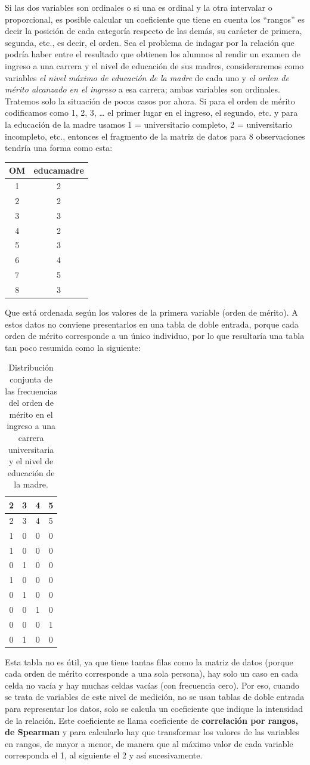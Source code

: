 \documentclass[]{book}
\begin{document}
Si las dos variables son ordinales o si una es ordinal y la otra
intervalar o proporcional, es posible calcular un coeficiente que tiene
en cuenta los ``rangos'' es decir la posición de cada categoría respecto
de las demás, su carácter de primera, segunda, etc., es decir, el orden.
Sea el problema de indagar por la relación que podría haber entre el
resultado que obtienen los alumnos al rendir un examen de ingreso a una
carrera y el nivel de educación de sus madres, consideraremos como
variables \emph{el nivel máximo de educación de la madre} de cada uno y \emph{el orden de mérito alcanzado en el ingreso} a esa carrera; ambas variables
son ordinales. Tratemos solo la situación de pocos casos por ahora. Si
para el orden de mérito codificamos como 1, 2, 3, \ldots{} el primer lugar en el
ingreso, el segundo, etc. y para la educación de la madre usamos 1 =
universitario completo, 2 = universitario incompleto, etc., entonces el
fragmento de la matriz de datos para 8 observaciones tendría una forma
como esta:

\begin{longtable}[]{@{}cc@{}}
\toprule
OM & educamadre\tabularnewline
\midrule
\endhead
1 & 2\tabularnewline
2 & 2\tabularnewline
3 & 3\tabularnewline
4 & 2\tabularnewline
5 & 3\tabularnewline
6 & 4\tabularnewline
7 & 5\tabularnewline
8 & 3\tabularnewline
\bottomrule
\end{longtable}

Que está ordenada según los valores de la primera variable (orden de
mérito). A estos datos no conviene presentarlos en una tabla de doble entrada, porque cada orden de mérito corresponde a un único individuo, por lo que resultaría una tabla tan poco resumida como la siguiente:

\begin{longtable}[]{@{}cccc@{}}
\caption{\label{tab:unnamed-chunk-141}Distribución conjunta de las frecuencias del orden de mérito en el ingreso a una carrera universitaria y el nivel de educación de la madre.}\tabularnewline
\toprule
2 & 3 & 4 & 5\tabularnewline
\midrule
\endfirsthead
\toprule
2 & 3 & 4 & 5\tabularnewline
\midrule
\endhead
1 & 0 & 0 & 0\tabularnewline
1 & 0 & 0 & 0\tabularnewline
0 & 1 & 0 & 0\tabularnewline
1 & 0 & 0 & 0\tabularnewline
0 & 1 & 0 & 0\tabularnewline
0 & 0 & 1 & 0\tabularnewline
0 & 0 & 0 & 1\tabularnewline
0 & 1 & 0 & 0\tabularnewline
\bottomrule
\end{longtable}

Esta tabla no es útil, ya que tiene tantas filas como la matriz de datos (porque cada orden de mérito corresponde a una sola persona), hay solo un caso en cada celda no vacía y hay muchas celdas vacías (con frecuencia cero). Por eso, cuando se trata de variables de este nivel de medición, no se usan tablas de doble entrada para representar los datos, solo se calcula un coeficiente que indique la intensidad de la relación. Este coeficiente se llama coeficiente de \textbf{correlación por rangos, de Spearman} y para calcularlo hay que transformar los valores de las variables en rangos, de mayor a menor, de manera que al máximo valor de cada variable corresponda el 1, al siguiente el 2 y así sucesivamente.
\end{document}
